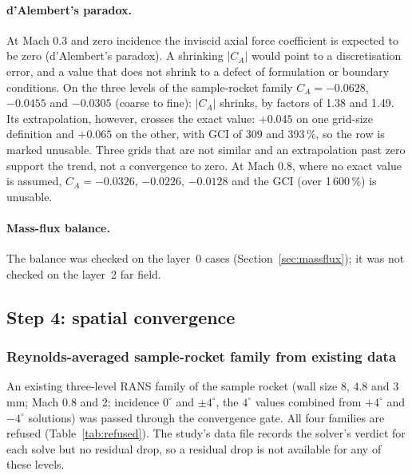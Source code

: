 \documentclass[11pt,a4paper]{article}
\begin{document}
\paragraph{d'Alembert's paradox.}
At Mach 0.3 and zero incidence the inviscid axial force coefficient is expected to be zero (d'Alembert's paradox).
A shrinking $|C_A|$ would point to a discretisation error, and a value that does not shrink to a defect of formulation or boundary conditions.
On the three levels of the sample-rocket family $C_A=-0.0628$, $-0.0455$ and $-0.0305$ (coarse to fine): $|C_A|$ shrinks, by factors of 1.38 and 1.49.
Its extrapolation, however, crosses the exact value: $+0.045$ on one grid-size definition and $+0.065$ on the other, with GCI of 309 and 393\,\%, so the
row is marked unusable.
Three grids that are not similar and an extrapolation past zero support the trend, not a convergence to zero.
At Mach 0.8, where no exact value is assumed, $C_A=-0.0326$, $-0.0226$, $-0.0128$ and the GCI (over 1\,600\,\%) is unusable.

\paragraph{Mass-flux balance.}
The balance was checked on the layer~0 cases (Section~\ref{sec:massflux}); it was not checked on the layer~2 far
field.

\subsection{Step 4: spatial convergence}
\label{sec:grid}

\subsubsection{Reynolds-averaged sample-rocket family from existing data}

An existing three-level RANS family of the sample rocket (wall size 8, 4.8 and 3\,mm; Mach 0.8 and 2; incidence
$0^\circ$ and $\pm4^\circ$, the $4^\circ$ values combined from $+4^\circ$ and $-4^\circ$ solutions) was passed through
the convergence gate.
All four families are refused (Table~\ref{tab:refused}).
The study's data file records the solver's verdict for each solve but no residual drop, so a residual drop is
not available for any of these levels.
\end{document}
